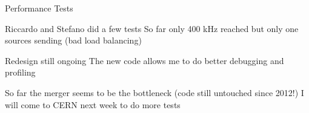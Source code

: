 \begin{frame}{Performance Tests}{}
	
	\begin{block}{Riccardo and Stefano did a few tests}
		So far only 400 kHz reached but only one sources sending (bad load balancing)
	\end{block}
	
	\begin{block}{Redesign still ongoing}
		The new code allows me to do better debugging and profiling
	\end{block}
	
	So far the merger seems to be the bottleneck (code still untouched since 2012!)
	\newline
	I will come to CERN next week to do more tests
\end{frame}